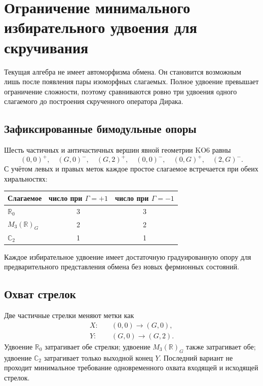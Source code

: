 \chapter{Ограничение минимального избирательного удвоения для скручивания}

Текущая алгебра не имеет автоморфизма обмена. Он становится возможным лишь
после появления пары изоморфных слагаемых. Полное удвоение превышает
ограничение сложности, поэтому сравниваются ровно три удвоения одного
слагаемого до построения скрученного оператора Дирака.

\section{Зафиксированные бимодульные опоры}

Шесть частичных и античастичных вершин явной геометрии KO6 равны
\begin{equation}
 (0,0)^+,\quad(G,0)^-,\quad(G,2)^+,\quad
 (0,0)^-,\quad(0,G)^+,\quad(2,G)^-.
 \label{eq:v5-twist-six-vertices}
\end{equation}
С учётом левых и правых меток каждое простое слагаемое встречается при обеих
хиральностях:
\begin{center}
\begin{tabular}{lcc}
\toprule
Слагаемое & число при \(\Gamma=+1\) & число при \(\Gamma=-1\)\\
\midrule
\(\mathbb R_0\) & 3 & 3\\
\(M_3(\mathbb R)_G\) & 2 & 2\\
\(\mathbb C_2\) & 1 & 1\\
\bottomrule
\end{tabular}
\end{center}
Каждое избирательное удвоение имеет достаточную градуированную опору для
предварительного представления обмена без новых фермионных состояний.

\section{Охват стрелок}

Две частичные стрелки меняют метки как
\begin{align}
 X:&\quad(0,0)\longrightarrow(G,0),\\
 Y:&\quad(G,0)\longrightarrow(G,2).
\end{align}
Удвоение \(\mathbb R_0\) затрагивает обе стрелки; удвоение
\(M_3(\mathbb R)_G\) также затрагивает обе; удвоение \(\mathbb C_2\)
затрагивает только выходной конец \(Y\). Последний вариант не проходит
минимальное требование одновременного охвата входящей и исходящей стрелок.

